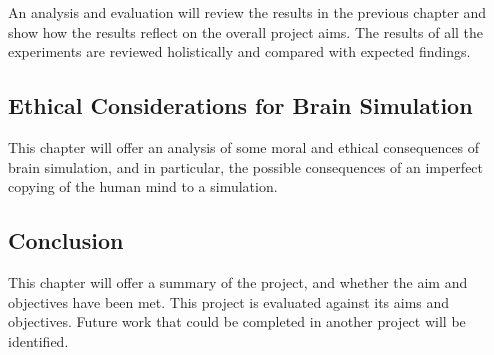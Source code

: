 An analysis and evaluation will review the results in the previous chapter and
show how the results reflect on the overall project aims. The results of all the
experiments are reviewed holistically and compared with expected findings.

\subsection*{Ethical Considerations for Brain Simulation}
This chapter will offer an analysis of some moral and ethical consequences of
brain simulation, and in particular, the possible consequences of an imperfect
copying of the human mind to a simulation.

\subsection*{Conclusion}
This chapter will offer a summary of the project, and whether the aim and
objectives have been met. This project is evaluated against its aims and
objectives. Future work that could be completed in another project will be
identified.